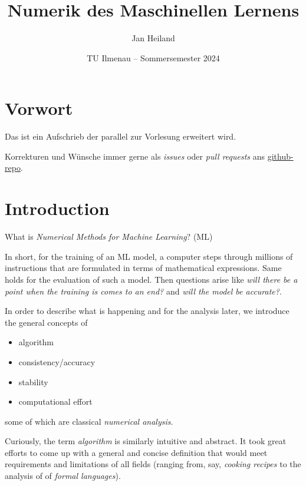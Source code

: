 \documentclass[
]{book}
\title{Numerik des Maschinellen Lernens}
\author{Jan Heiland}
\date{TU Ilmenau -- Sommersemester 2024}
\providecommand{\tightlist}{%
  \setlength{\itemsep}{0pt}\setlength{\parskip}{0pt}}
\theoremstyle{definition}
\theoremstyle{definition}
\theoremstyle{definition}
\theoremstyle{definition}
\theoremstyle{remark}
\begin{document}
\maketitle

{
\hypersetup{linkcolor=}
\setcounter{tocdepth}{1}
\tableofcontents
}
\hypertarget{vorwort}{%
\chapter*{Vorwort}\label{vorwort}}

Das ist ein Aufschrieb der parallel zur Vorlesung erweitert wird.

Korrekturen und Wünsche immer gerne als \emph{issues} oder \emph{pull requests} ans \href{https://github.com/highlando/script-nmdl}{github-repo}.

\hypertarget{introduction}{%
\chapter{Introduction}\label{introduction}}

What is \emph{Numerical Methods for Machine Learning}? (ML)

In short, for the training of an ML model, a computer steps through millions of instructions that are formulated in terms of mathematical expressions.
Same holds for the evaluation of such a model.
Then questions arise like \emph{will there be a point when the training is comes to an end?} and \emph{will the model be accurate?}.

In order to describe what is happening and for the analysis later, we introduce the general concepts of

\begin{itemize}
\tightlist
\item
  algorithm
\item
  consistency/accuracy
\item
  stability
\item
  computational effort
\end{itemize}

some of which are classical \emph{numerical analysis}.

Curiously, the term \emph{algorithm} is similarly intuitive and abstract. It took great efforts to come up with a general and concise definition that would meet requirements and limitations of all fields (ranging from, say, \emph{cooking recipes} to the analysis of of \emph{formal languages}).
\end{document}
